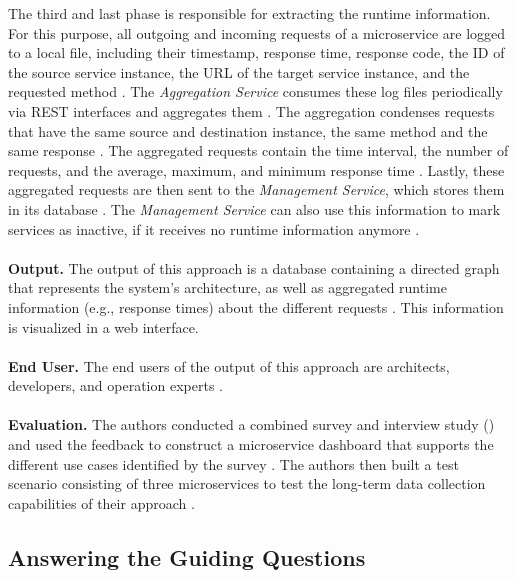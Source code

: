 The third and last phase is responsible for extracting the runtime information.
For this purpose, all outgoing and incoming requests of a microservice are logged to a local file, including their timestamp, response time, response code, the ID of the source service instance, the URL of the target service instance, and the requested method \cite{Mayer2018}.
The \textit{Aggregation Service} consumes these log files periodically via REST interfaces and aggregates them \cite{Mayer2018}.
The aggregation condenses requests that have the same source and destination instance, the same method and the same response \cite{Mayer2018}.
The aggregated requests contain the time interval, the number of requests, and the average, maximum, and minimum response time \cite{Mayer2018}.
Lastly, these aggregated requests are then sent to the \textit{Management Service}, which stores them in its database \cite{Mayer2018}.
The \textit{Management Service} can also use this information to mark services as inactive, if it receives no runtime information anymore \cite{Mayer2018}.
\\ \\
\textbf{Output.}
The output of this approach is a database containing a directed graph that represents the system's architecture, as well as aggregated runtime information (e.g., response times) about the different requests \cite{Mayer2018}.
This information is visualized in a web interface.
\\ \\
\textbf{End User.}
The end users of the output of this approach are architects, developers, and operation experts \cite{Mayer2018}.
\\ \\
\textbf{Evaluation.}
The authors conducted a combined survey and interview study (\cite{Mayer2017dashboard}) and used the feedback to construct a microservice dashboard that supports the different use cases identified by the survey \cite{Mayer2018}.
The authors then built a test scenario consisting of three microservices to test the long-term data collection capabilities of their approach \cite{Mayer2018}.


\subsection{Answering the Guiding Questions}
\label{sec:Results:AnsweringRQ}

